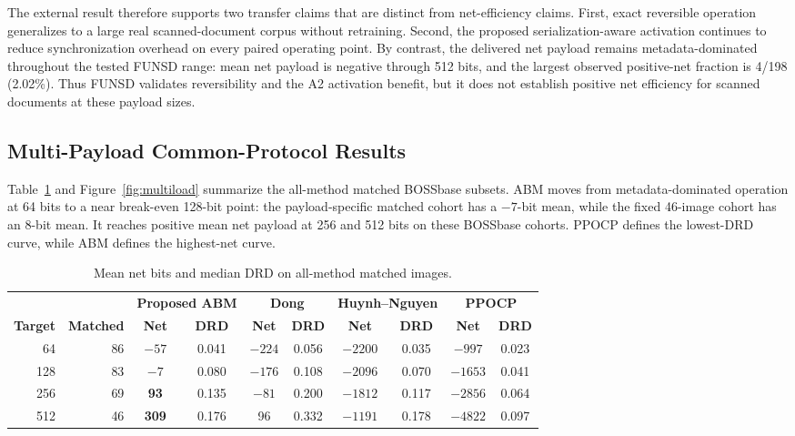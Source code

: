 \documentclass[a4paper,fleqn]{cas-dc}
\newcommand{\RevisionAddBegin}{\begingroup}
\newcommand{\RevisionAddEnd}{\endgroup}
\newcommand{\RevisionAddBegin}{\begingroup\color{revisionblue}}
\newcommand{\RevisionAddEnd}{\endgroup}
\begin{document}
The external result therefore supports two transfer claims that are distinct
from net-efficiency claims. First, exact reversible operation generalizes to a
large real scanned-document corpus without retraining. Second, the proposed
serialization-aware activation continues to reduce synchronization overhead on
every paired operating point. By contrast, the delivered net payload remains
metadata-dominated throughout the tested FUNSD range: mean net payload is
negative through 512 bits, and the largest observed positive-net fraction is
4/198 (2.02\%). Thus FUNSD validates reversibility and the A2 activation
benefit, but it does not establish positive net efficiency for scanned
documents at these payload sizes.
\RevisionAddEnd

\subsection{Multi-Payload Common-Protocol Results}

\RevisionAddBegin
Table~\ref{tab:multiload} and Figure~\ref{fig:multiload} summarize the
all-method matched BOSSbase subsets. ABM moves from metadata-dominated operation
at 64 bits to a near break-even 128-bit point: the payload-specific matched
cohort has a $-7$-bit mean, while the fixed 46-image cohort has an 8-bit mean.
It reaches positive mean net payload at 256 and 512 bits on these BOSSbase
cohorts. PPOCP defines the lowest-DRD curve, while ABM defines the highest-net
curve.
\RevisionAddEnd

\begin{table}[t]
\centering
\caption{Mean net bits and median DRD on all-method matched images.}
\label{tab:multiload}
\begin{tabular*}{\textwidth}{@{\extracolsep{\fill}}rrcccccccc@{}}
\toprule
& & \multicolumn{2}{c}{\textbf{Proposed ABM}} &
\multicolumn{2}{c}{\textbf{Dong}} &
\multicolumn{2}{c}{\textbf{Huynh--Nguyen}} &
\multicolumn{2}{c}{\textbf{PPOCP}} \\
\cmidrule(lr){3-4}\cmidrule(lr){5-6}\cmidrule(lr){7-8}\cmidrule(lr){9-10}
\textbf{Target} & \textbf{Matched} & \textbf{Net} & \textbf{DRD} &
\textbf{Net} & \textbf{DRD} & \textbf{Net} & \textbf{DRD} &
\textbf{Net} & \textbf{DRD} \\
\midrule
64  & 86 & $-57$ & 0.041 & $-224$ & 0.056 & $-2200$ & 0.035 & $-997$ & 0.023 \\
128 & 83 & $-7$  & 0.080 & $-176$ & 0.108 & $-2096$ & 0.070 & $-1653$ & 0.041 \\
256 & 69 & \textbf{93} & 0.135 & $-81$ & 0.200 & $-1812$ & 0.117 & $-2856$ & 0.064 \\
512 & 46 & \textbf{309} & 0.176 & 96 & 0.332 & $-1191$ & 0.178 & $-4822$ & 0.097 \\
\bottomrule
\end{tabular*}
\end{table}
\end{document}
